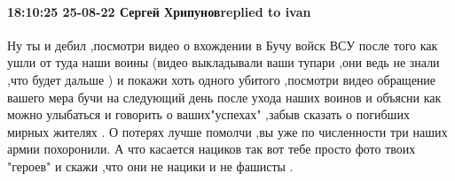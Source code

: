  
 
 
 
 


\paragraph{18:10:25 25-08-22 Сергей Хрипуновreplied to ivan}

Ну ты и дебил ,посмотри видео о вхождении в Бучу войск ВСУ после того как ушли
от туда наши воины (видео выкладывали ваши тупари ,они ведь не знали ,что будет
дальше ) и покажи хоть одного убитого ,посмотри видео обращение вашего мера
бучи на следующий день после ухода наших воинов и объясни как можно улыбаться и
говорить о ваших"успехах" ,забыв сказать о погибших мирных жителях . О потерях
лучше помолчи ,вы уже по численности три наших армии похоронили. А что касается
нациков так вот тебе просто фото твоих "героев" и скажи ,что они не нацики и не
фашисты .
